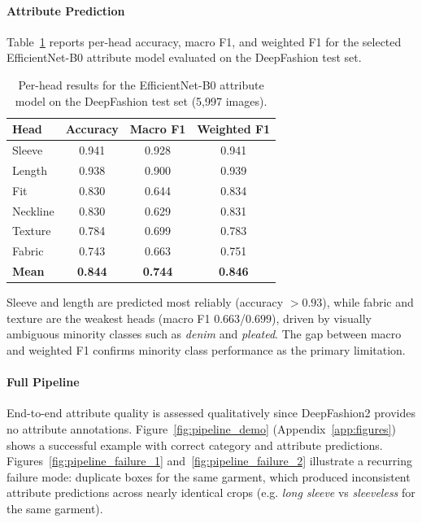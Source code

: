 \documentclass{article}
\begin{document}
\paragraph{Attribute Prediction}
Table~\ref{tab:attr_results} reports per-head accuracy, macro F1, and weighted F1 for the selected EfficientNet-B0 attribute model evaluated on the DeepFashion test set.

\begin{table}[h!]
\centering\small
\caption{Per-head results for the EfficientNet-B0 attribute model on the DeepFashion test set (5{,}997 images).}
\label{tab:attr_results}
\begin{tabular}{lccc}
\toprule
\textbf{Head} & \textbf{Accuracy} & \textbf{Macro F1} & \textbf{Weighted F1} \\
\midrule
Sleeve   & 0.941 & 0.928 & 0.941 \\
Length   & 0.938 & 0.900 & 0.939 \\
Fit      & 0.830 & 0.644 & 0.834 \\
Neckline & 0.830 & 0.629 & 0.831 \\
Texture  & 0.784 & 0.699 & 0.783 \\
Fabric   & 0.743 & 0.663 & 0.751 \\
\midrule
\textbf{Mean} & \textbf{0.844} & \textbf{0.744} & \textbf{0.846} \\

\bottomrule
\end{tabular}
\end{table}

Sleeve and length are predicted most reliably (accuracy $>0.93$), while fabric and texture are the weakest heads (macro F1 $0.663$/$0.699$), driven by visually ambiguous minority classes such as \emph{denim} and \emph{pleated}. The gap between macro and weighted F1 confirms minority class performance as the primary limitation.

\paragraph{Full Pipeline}
End-to-end attribute quality is assessed qualitatively since DeepFashion2 provides no attribute annotations. Figure~\ref{fig:pipeline_demo} (Appendix~\ref{app:figures}) shows a successful example with correct category and attribute predictions. Figures~\ref{fig:pipeline_failure_1} and~\ref{fig:pipeline_failure_2} illustrate a recurring failure mode: duplicate boxes for the same garment, which produced inconsistent attribute predictions across nearly identical crops (e.g. \emph{long sleeve} vs \emph{sleeveless} for the same garment).
\end{document}
